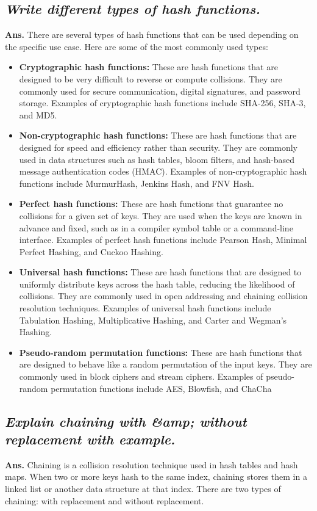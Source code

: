 \documentclass{article}
\begin{document}
\subsection{\textit{Write different types of hash functions.}}
\textbf{Ans.} There are several types of hash functions that can be used depending on the specific use case. Here are some of the most commonly used types:
\begin{itemize}
	\item \textbf{Cryptographic hash functions:} These are hash functions that are designed to be very difficult to reverse or compute collisions. They are commonly used for secure communication, digital signatures, and password storage. Examples of cryptographic hash functions include SHA-256, SHA-3, and MD5.
	\item \textbf{Non-cryptographic hash functions:} These are hash functions that are designed for speed and efficiency rather than security. They are commonly used in data structures such as hash tables, bloom filters, and hash-based message authentication codes (HMAC). Examples of non-cryptographic hash functions include MurmurHash, Jenkins Hash, and FNV Hash.
	\item \textbf{Perfect hash functions:} These are hash functions that guarantee no collisions for a given set of keys. They are used when the keys are known in advance and fixed, such as in a compiler symbol table or a command-line interface. Examples of perfect hash functions include Pearson Hash, Minimal Perfect Hashing, and Cuckoo Hashing.
	\item \textbf{Universal hash functions:} These are hash functions that are designed to uniformly distribute keys across the hash table, reducing the likelihood of collisions. They are commonly used in open addressing and chaining collision resolution techniques. Examples of universal hash functions include Tabulation Hashing, Multiplicative Hashing, and Carter and Wegman's Hashing.
	\item \textbf{Pseudo-random permutation functions:} These are hash functions that are designed to behave like a random permutation of the input keys. They are commonly used in block ciphers and stream ciphers. Examples of pseudo-random permutation functions include AES, Blowfish, and ChaCha
\end{itemize}
\subsection{\textit{Explain chaining with &amp; without replacement with example.}}
\textbf{Ans.} Chaining is a collision resolution technique used in hash tables and hash maps. When two or more keys hash to the same index, chaining stores them in a linked list or another data structure at that index. There are two types of chaining: with replacement and without replacement.\\
\end{document}
